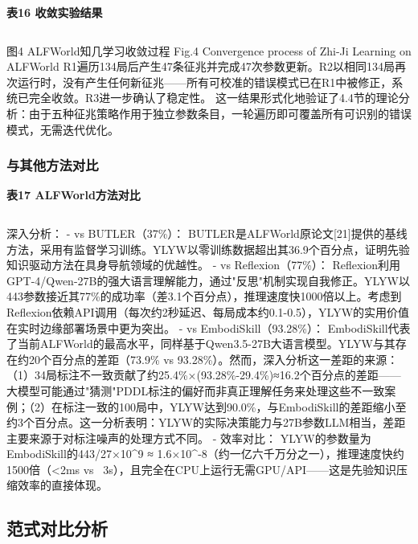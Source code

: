 \documentclass[12pt,a4paper]{article}
\begin{document}
\begin{center}
\textbf{表16  收敛实验结果}
\begin{tabular}{lcccc}
\hline
\end{tabular}
\end{center}

图4  ALFWorld知几学习收敛过程
Fig.4  Convergence process of Zhi-Ji Learning on ALFWorld
R1遍历134局后产生47条征兆并完成47次参数更新。R2以相同134局再次运行时，没有产生任何新征兆——所有可校准的错误模式已在R1中被修正，系统已完全收敛。R3进一步确认了稳定性。
这一结果形式化地验证了4.4节的理论分析：由于五种征兆策略作用于独立参数条目，一轮遍历即可覆盖所有可识别的错误模式，无需迭代优化。

\subsubsection{与其他方法对比}

\begin{center}
\textbf{表17  ALFWorld方法对比}
\begin{tabular}{lcccc}
\hline
\end{tabular}
\end{center}
深入分析：
- vs BUTLER（37\%）： BUTLER是ALFWorld原论文[21]提供的基线方法，采用有监督学习训练。YLYW以零训练数据超出其36.9个百分点，证明先验知识驱动方法在具身导航领域的优越性。
- vs Reflexion（77\%）： Reflexion利用GPT-4/Qwen-27B的强大语言理解能力，通过"反思"机制实现自我修正。YLYW以443参数接近其77\%的成功率（差3.1个百分点），推理速度快1000倍以上。考虑到Reflexion依赖API调用（每次约2秒延迟、每局成本约0.1-0.5），YLYW的实用价值在实时边缘部署场景中更为突出。
- vs EmbodiSkill（93.28\%）： EmbodiSkill代表了当前ALFWorld的最高水平，同样基于Qwen3.5-27B大语言模型。YLYW与其存在约20个百分点的差距（73.9\% vs 93.28\%）。然而，深入分析这一差距的来源：（1）34局标注不一致贡献了约25.4\%×(93.28\%-29.4\%)≈16.2个百分点的差距——大模型可能通过"猜测"PDDL标注的偏好而非真正理解任务来处理这些不一致案例；（2）在标注一致的100局中，YLYW达到90.0\%，与EmbodiSkill的差距缩小至约3个百分点。这一分析表明：YLYW的实际决策能力与27B参数LLM相当，差距主要来源于对标注噪声的处理方式不同。
- 效率对比： YLYW的参数量为EmbodiSkill的443/27×10^9 ≈ 1.6×10^{-8}（约一亿六千万分之一），推理速度快约1500倍（<2ms vs ~3s），且完全在CPU上运行无需GPU/API——这是先验知识压缩效率的直接体现。

\subsection{范式对比分析}
\end{document}
